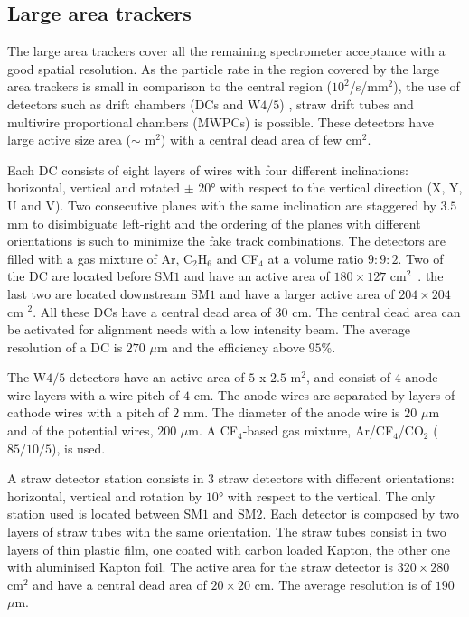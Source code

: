 \subsection{Large area trackers}

The large area trackers cover all the remaining spectrometer acceptance with a good spatial resolution. As the particle rate in the region covered by the large area trackers is small in comparison to the central region ($10^2$/s/mm$^2$), the use of detectors such as drift chambers (DCs and W$4/5$) \cite{DaCosta}, straw drift tubes \cite{Zvyagin} and multiwire proportional chambers (MWPCs) is possible. These detectors have large active size area ($\sim$ m$^2$) with a central dead area of few cm$^2$.

Each DC consists of eight layers of wires with four different inclinations: horizontal, vertical and rotated $\pm$ $20$° with respect to the vertical direction (X, Y, U and V). Two consecutive planes with the same inclination are staggered by $3.5$ mm to disimbiguate left-right and the ordering of the planes with different orientations is such to minimize the fake track combinations. The detectors are filled with a gas mixture of Ar, C$_2$H$_6$ and CF$_4$ at a volume ratio $9:9:2$. Two of the DC are located before SM$1$ and have an active area of $180 \times 127$ cm$^2$~. the last two are located downstream SM$1$ and have a larger active area of $204 \times 204$ cm $^2$. All these DCs have a central dead area of $30$ cm. The central dead area can be activated for alignment needs with a low intensity beam. The average resolution of a DC is $270$ $\mu$m and the efficiency above $95$\%.

The W$4/5$ detectors have an active area of $5$ x $2.5$ m$^2$, and consist of $4$ anode wire layers with a wire pitch of $4$ cm. The anode wires are separated by layers of cathode wires with a pitch of $2$ mm. The diameter of the anode wire is $20$ $\mu$m and of the potential wires, $200$ $\mu$m. A CF$_4$-based gas mixture, Ar/CF$_4$/CO$_2$ ($85/10/5$), is used.

A straw detector station consists in $3$ straw detectors with different orientations: horizontal, vertical and rotation by $10$° with respect to the vertical. The only station used is located between SM$1$ and SM$2$. Each detector is composed by two layers of straw tubes with the same orientation. The straw tubes consist in two layers of thin plastic film, one coated with carbon loaded Kapton, the other one with aluminised Kapton foil. The active area for the straw detector is $320 \times 280$ cm$^2$ and have a central dead area of $20 \times 20$ cm. The average resolution is of $190$ $\mu$m.


